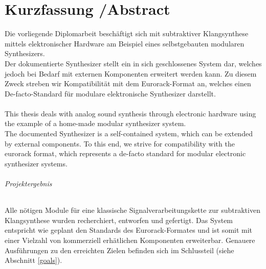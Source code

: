 \chapter*{Kurzfassung /Abstract }
\label{cha:abstract}

Die vorliegende Diplomarbeit beschäftigt sich mit subtraktiver Klangsynthese mittels elektronischer Hardware am Beispiel eines selbstgebauten modularen Synthesizers. \\

Der dokumentierte Synthesizer stellt ein in sich geschlossenes System dar, welches jedoch bei Bedarf mit externen Komponenten erweitert werden kann. Zu diesem Zweck streben wir Kompatibilität mit dem Eurorack-Format an, welches einen De-facto-Standard für modulare elektronische Synthesizer darstellt. \\ \\

This thesis deals with analog sound synthesis through electronic hardware using the example of a home-made modular synthesizer system. \\

The documented Synthesizer is a self-contained system, which can be extended by external components. To this end, we strive for compatibility with the eurorack format, which represents a de-facto standard for modular electronic synthesizer systems. \\

\newpage

\subparagraph{Projektergebnis}
Alle nötigen Module für eine klassische Signalverarbeitungskette zur subtraktiven Klangsynthese wurden recherchiert, entworfen und gefertigt. Das System entspricht wie geplant den Standards des Eurorack-Formates und ist somit mit einer Vielzahl von kommerziell erhätlichen Komponenten erweiterbar. Genauere Ausführungen zu den erreichten Zielen befinden sich im Schlussteil (siehe Abschnitt \ref{goals}).
